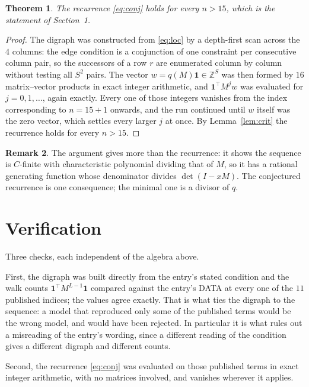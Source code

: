 \documentclass[11pt,a4paper]{article}
\theoremstyle{plain}
\newtheorem{theorem}{Theorem}
\theoremstyle{definition}
\newtheorem{remark}[theorem]{Remark}
\begin{document}
\begin{theorem}
The recurrence \eqref{eq:conj} holds for every $n>15$, which is the statement of
Section~1.
\end{theorem}

\begin{proof}
The digraph was constructed from \eqref{eq:loc} by a depth-first scan across the $4$
columns: the edge condition is a conjunction of one constraint per consecutive column
pair, so the successors of a row $r$ are enumerated column by column without testing all
$S^2$ pairs. The vector $w=q(M)\mathbf{1}\in\mathbb{Z}^{S}$ was then formed by $16$
matrix--vector products in exact integer arithmetic, and $\mathbf{1}^{\!\top}M^{j}w$ was
evaluated for $j=0,1,\dots$, again exactly. Every one of those integers vanishes from the
index corresponding to $n=15+1$ onwards, and the run continued until $w$ itself was the
zero vector, which settles every larger $j$ at once. By Lemma~\ref{lem:crit} the recurrence
holds for every $n>15$.
\end{proof}

\begin{remark}
The argument gives more than the recurrence: it shows the sequence is $C$-finite with
characteristic polynomial dividing that of $M$, so it has a rational generating function
whose denominator divides $\det(I-xM)$. The conjectured recurrence is one consequence; the
minimal one is a divisor of $q$.
\end{remark}

\section{Verification}

Three checks, each independent of the algebra above.

First, the digraph was built directly from the entry's stated condition and the walk counts
$\mathbf{1}^{\!\top}M^{L-1}\mathbf{1}$ compared against the entry's DATA at
every one of the $11$ published indices; the values agree exactly. That is what ties
the digraph to the sequence: a model that reproduced only some of the published terms would
be the wrong model, and would have been rejected. In particular it is what rules out a
misreading of the entry's wording, since a different reading of the condition gives a
different digraph and different counts.

Second, the recurrence \eqref{eq:conj} was evaluated on those published terms in exact
integer arithmetic, with no matrices involved, and vanishes wherever it applies.
\end{document}
